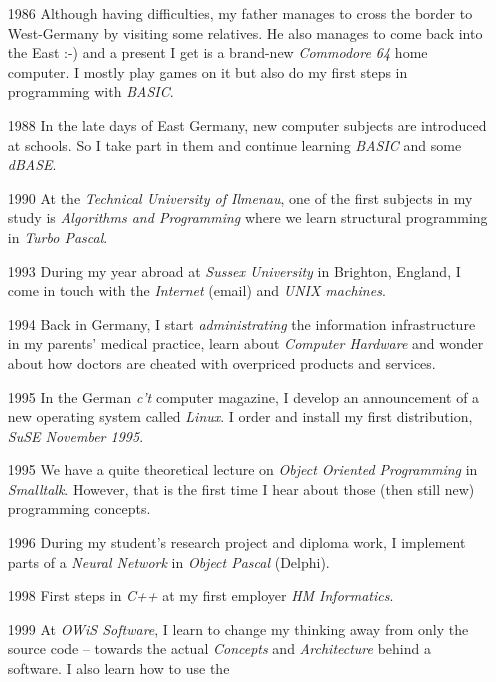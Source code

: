 \begin{itemize}
    \item[1986] Although having difficulties, my father manages to cross the
        border to West-Germany by visiting some relatives. He also manages to
        come back into the East :-) and a present I get is a brand-new
        \emph{Commodore 64} home computer. I mostly play games on it but also
        do my first steps in programming with \emph{BASIC}.
    \item[1988] In the late days of East Germany, new computer subjects are
        introduced at schools. So I take part in them and continue learning
        \emph{BASIC} and some \emph{dBASE}.
    \item[1990] At the \emph{Technical University of Ilmenau}, one of the first
        subjects in my study is \emph{Algorithms and Programming} where we learn
        structural programming in \emph{Turbo Pascal}.
    \item[1993] During my year abroad at \emph{Sussex University} in Brighton,
        England, I come in touch with the \emph{Internet} (email) and
        \emph{UNIX machines}.
    \item[1994] Back in Germany, I start \emph{administrating} the information
        infrastructure in my parents' medical practice, learn about
        \emph{Computer Hardware} and wonder about how doctors are cheated with
        overpriced products and services.
    \item[1995] In the German \emph{c't} computer magazine, I develop an
        announcement of a new operating system called \emph{Linux}. I order and
        install my first distribution, \emph{SuSE November 1995}.
    \item[1995] We have a quite theoretical lecture on
        \emph{Object Oriented Programming} in \emph{Smalltalk}. However, that
        is the first time I hear about those (then still new) programming
        concepts.
    \item[1996] During my student's research project and diploma work, I
        implement parts of a \emph{Neural Network} in \emph{Object Pascal}
        (Delphi).
    \item[1998] First steps in \emph{C++} at my first employer
        \emph{HM Informatics}.
    \item[1999] At \emph{OWiS Software}, I learn to change my thinking away
        from only the source code -- towards the actual \emph{Concepts} and
        \emph{Architecture} behind a software. I also learn how to use the

\end{itemize}

